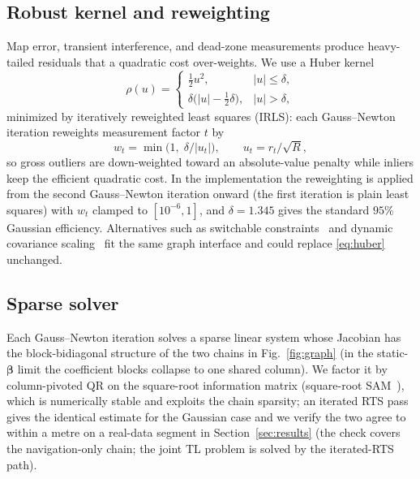 \documentclass{IEEEtaes}
\begin{document}
\subsection{Robust kernel and reweighting}
Map error, transient interference, and dead-zone measurements produce heavy-tailed
residuals that a quadratic cost over-weights. We use a Huber kernel~\cite{huber1964}
\begin{equation}
\rho(u)=\begin{cases}\tfrac12 u^2,& |u|\le\delta,\\
\delta\big(|u|-\tfrac12\delta\big),& |u|>\delta,\end{cases}
\label{eq:huber}
\end{equation}
minimized by iteratively reweighted least squares (IRLS): each Gauss--Newton
iteration reweights measurement factor $t$ by
\begin{equation}
w_t=\min\!\big(1,\;\delta/|u_t|\big),\qquad u_t=r_t/\sqrt{R},
\label{eq:irls}
\end{equation}
so gross outliers are down-weighted toward an absolute-value penalty while inliers
keep the efficient quadratic cost. In the implementation the reweighting is applied
from the second Gauss--Newton iteration onward (the first iteration is plain least
squares) with $w_t$ clamped to $[10^{-6},1]$, and $\delta=1.345$ gives the standard
$95\%$ Gaussian efficiency. Alternatives such as switchable
constraints~\cite{sunderhauf2012} and dynamic covariance
scaling~\cite{agarwal2013} fit the same graph interface and could replace
\eqref{eq:huber} unchanged.

\subsection{Sparse solver}
Each Gauss--Newton iteration solves a sparse linear system whose Jacobian has the
block-bidiagonal structure of the two chains in Fig.~\ref{fig:graph} (in the
static-$\boldsymbol{\beta}$ limit the coefficient blocks collapse to one shared
column). We factor it
by column-pivoted QR on the square-root information matrix (square-root
SAM~\cite{dellaert2006,dellaert2017}), which is numerically stable and exploits the
chain sparsity; an iterated RTS pass~\cite{rauch1965} gives the identical estimate
for the Gaussian case and we verify the two agree to within a metre on a real-data
segment in Section~\ref{sec:results} (the check covers the navigation-only chain;
the joint TL problem is solved by the iterated-RTS path).
\end{document}
